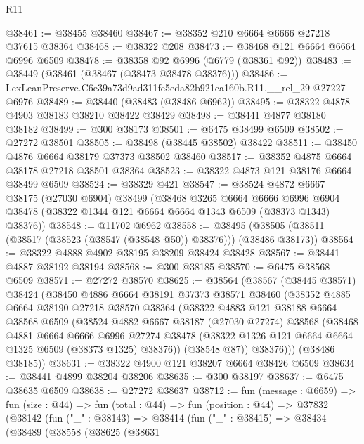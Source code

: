 \begin{lexlean}{R11}
\begin{coremodule}
@38461 := @38455 @38460
@38467 := @38352 @210 @6664 @6666 @27218 @37615 @38364
@38468 := @38322 @208
@38473 := @38468 @121 @6664 @6664 @6996 @6509
@38478 := @38358 @92 @6996 (@6779 (@38361 @92))
@38483 := @38449 (@38461 (@38467 (@38473 @38478 @38376)))
@38486 := LexLeanPreserve.C6e39a73d9ad311fe5eda82b921ca160b.R11.__rel_29 @27227 @6976
@38489 := @38440 (@38483 (@38486 @6962))
@38495 := @38322 @4878 @4903 @38183 @38210 @38422 @38429
@38498 := @38441 @4877 @38180 @38182
@38499 := @300 @38173
@38501 := @6475 @38499 @6509
@38502 := @27272 @38501
@38505 := @38498 (@38445 @38502) @38422
@38511 := @38450 @4876 @6664 @38179 @37373 @38502 @38460
@38517 := @38352 @4875 @6664 @38178 @27218 @38501 @38364
@38523 := @38322 @4873 @121 @38176 @6664 @38499 @6509
@38524 := @38329 @421
@38547 := @38524
    @4872
    @6667
    @38175
    (@27030 @6904)
    @38499
    (@38468
      @3265
      @6664
      @6666
      @6996
      @6904
      @38478
      (@38322 @1344 @121 @6664 @6664 @1343 @6509 (@38373 @1343) @38376))
@38548 := @11702 @6962
@38558 := @38495 (@38505 (@38511 (@38517 (@38523 (@38547 (@38548 @50)) @38376))) (@38486 @38173))
@38564 := @38322 @4888 @4902 @38195 @38209 @38424 @38428
@38567 := @38441 @4887 @38192 @38194
@38568 := @300 @38185
@38570 := @6475 @38568 @6509
@38571 := @27272 @38570
@38625 := @38564
    (@38567
      (@38445 @38571)
      @38424
      (@38450
        @4886
        @6664
        @38191
        @37373
        @38571
        @38460
        (@38352
          @4885
          @6664
          @38190
          @27218
          @38570
          @38364
          (@38322
            @4883
            @121
            @38188
            @6664
            @38568
            @6509
            (@38524
              @4882
              @6667
              @38187
              (@27030 @27274)
              @38568
              (@38468
                @4881
                @6664
                @6666
                @6996
                @27274
                @38478
                (@38322 @1326 @121 @6664 @6664 @1325 @6509 (@38373 @1325) @38376))
              (@38548 @87))
            @38376)))
      (@38486 @38185))
@38631 := @38322 @4900 @121 @38207 @6664 @38426 @6509
@38634 := @38441 @4899 @38204 @38206
@38635 := @300 @38197
@38637 := @6475 @38635 @6509
@38638 := @27272 @38637
@38712 := fun (message : @6659) =>
  fun (size : @44) =>
  fun (total : @44) =>
  fun (position : @44) =>
  @37832
    (@38142
      (fun ("_" : @38143) =>
      @38414
        (fun ("_" : @38415) =>
        @38434
          (@38489
            (@38558
              (@38625
                (@38631

\end{coremodule}
\end{lexlean}

